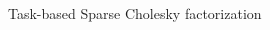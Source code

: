 \documentclass[unknownkeysallowed]{beamer}
\begin{document}
\begin{frame}{Task-based Sparse Cholesky factorization}
  \begin{columns}
    \begin{column}{0.6\textwidth}
      \only<1>{
        }
    \end{column}
    \begin{column}{0.4\textwidth}
      \centering
    \end{column}
  \end{columns}
\end{frame}
\end{document}
